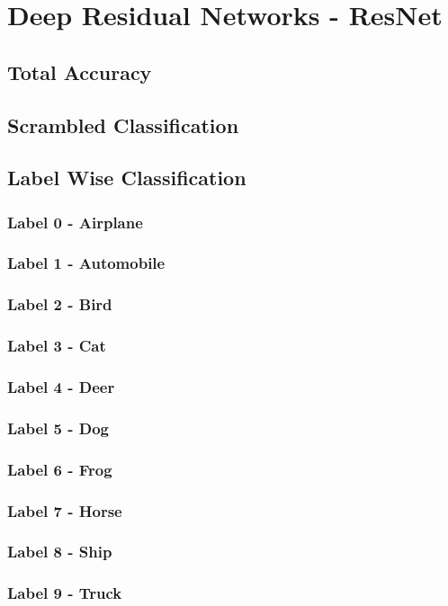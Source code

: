 \section{Deep Residual Networks - ResNet}

\subsection{Total Accuracy}
\subsection{Scrambled Classification}
\subsection{Label Wise Classification}
\subsubsection{Label 0 - Airplane}
\subsubsection{Label 1 - Automobile}
\subsubsection{Label 2 - Bird}
\subsubsection{Label 3 - Cat}
\subsubsection{Label 4 - Deer}
\subsubsection{Label 5 - Dog}
\subsubsection{Label 6 - Frog}
\subsubsection{Label 7 - Horse}
\subsubsection{Label 8 - Ship}
\subsubsection{Label 9 - Truck}
